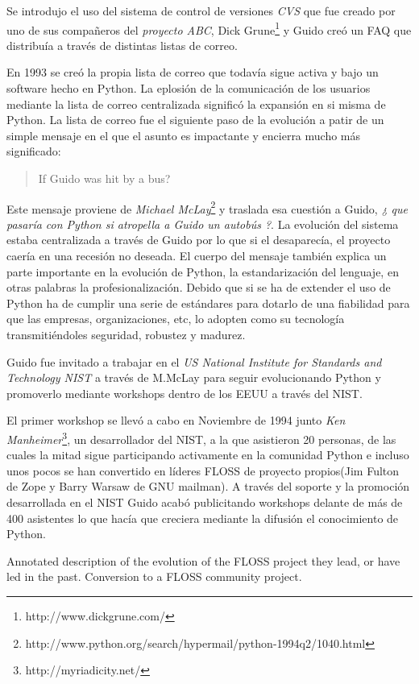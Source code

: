 \documentclass[11pt]{scrartcl}
\begin{document}
Se introdujo el uso del sistema de control de versiones \emph{CVS} que fue creado por uno de sus compañeros del \emph{proyecto ABC}, Dick Grune\footnote{http://www.dickgrune.com/} y Guido creó un FAQ que distribuía a través de distintas listas de correo.

En 1993 se creó la propia lista de correo que todavía sigue activa y bajo un software hecho en Python. La eplosión de la comunicación de los usuarios mediante la lista de correo centralizada significó la expansión en si misma de Python. La lista de correo fue el siguiente paso de la evolución a patir de un simple mensaje en el que el asunto es impactante y encierra mucho más significado:

\begin{quote}
If Guido was hit by a bus?
\end{quote}

Este mensaje proviene de \emph{Michael McLay}\footnote{http://www.python.org/search/hypermail/python-1994q2/1040.html} y traslada esa cuestión a Guido, \emph{¿ que pasaría con Python si atropella a Guido un autobús ?}. La evolución del sistema estaba centralizada a través de Guido por lo que si el desaparecía, el proyecto caería en una recesión no deseada.
El cuerpo del mensaje también explica un parte importante en la evolución de Python, la estandarización del lenguaje, en otras palabras la profesionalización. Debido que si se ha de extender el uso de Python ha de cumplir una serie de estándares para dotarlo de una fiabilidad para que las empresas, organizaciones, etc, lo adopten como su tecnología transmitiéndoles seguridad, robustez y madurez.

Guido fue invitado a trabajar en el \emph{US National Institute for Standards and Technology NIST} a través de M.McLay para seguir evolucionando Python y promoverlo mediante workshops dentro de los EEUU a través del NIST.

El primer workshop se llevó a cabo en Noviembre de 1994 junto \emph{Ken Manheimer}\footnote{http://myriadicity.net/}, un desarrollador del NIST, a la que asistieron 20 personas, de las cuales la mitad sigue participando activamente en la comunidad Python e incluso unos pocos se han convertido en líderes FLOSS de proyecto propios(Jim Fulton de Zope y Barry Warsaw de GNU mailman). A través del soporte y la promoción desarrollada en el NIST Guido acabó publicitando workshops delante de más de 400 asistentes lo que hacía que creciera mediante la difusión el conocimiento de Python.

Annotated description of the evolution of the FLOSS project they lead, or have led in the past.
Conversion to a FLOSS community project.
\end{document}
